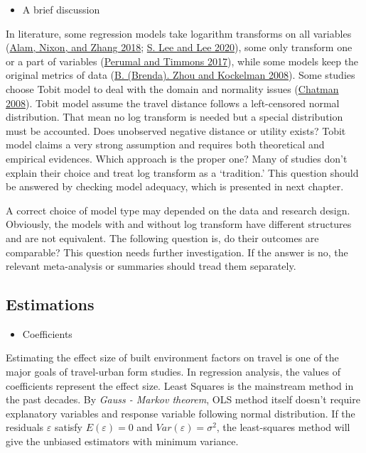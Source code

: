 \documentclass[
  11pt,
  openany]{memoir}
\providecommand{\tightlist}{%
  \setlength{\itemsep}{0pt}\setlength{\parskip}{0pt}}
\begin{document}
\begin{itemize}
\tightlist
\item
  A brief discussion
\end{itemize}

In literature, some regression models take logarithm transforms on all variables (\protect\hyperlink{ref-alamFactorsAffectingTravel2018}{Alam, Nixon, and Zhang 2018}; \protect\hyperlink{ref-leeComparingImpactsLocal2020}{S. Lee and Lee 2020}), some only transform one or a part of variables (\protect\hyperlink{ref-perumalContextualDensityUS2017}{Perumal and Timmons 2017}), while some models keep the original metrics of data (\protect\hyperlink{ref-zhouSelfSelectionHomeChoice2008}{B. (Brenda). Zhou and Kockelman 2008}).
Some studies choose Tobit model to deal with the domain and normality issues (\protect\hyperlink{ref-chatmanDeconstructingDevelopmentDensity2008}{Chatman 2008}).
Tobit model assume the travel distance follows a left-censored normal distribution.
That mean no log transform is needed but a special distribution must be accounted.
Does unobserved negative distance or utility exists?
Tobit model claims a very strong assumption and requires both theoretical and empirical evidences.
Which approach is the proper one?
Many of studies don't explain their choice and treat log transform as a `tradition.'
This question should be answered by checking model adequacy, which is presented in next chapter.

A correct choice of model type may depended on the data and research design.
Obviously, the models with and without log transform have different structures and are not equivalent.
The following question is, do their outcomes are comparable?
This question needs further investigation.
If the answer is no, the relevant meta-analysis or summaries should tread them separately.

\hypertarget{estimations}{%
\subsection{Estimations}\label{estimations}}

\begin{itemize}
\tightlist
\item
  Coefficients
\end{itemize}

Estimating the effect size of built environment factors on travel is one of the major goals of travel-urban form studies.
In regression analysis, the values of coefficients represent the effect size.
Least Squares is the mainstream method in the past decades. By \emph{Gauss - Markov theorem}, OLS method itself doesn't require explanatory variables and response variable following normal distribution. If the residuals \(\varepsilon\) satisfy \(E(\varepsilon) = 0\) and \(Var(\varepsilon) = \sigma^2\), the least-squares method will give the unbiased estimators with minimum variance.
\end{document}
